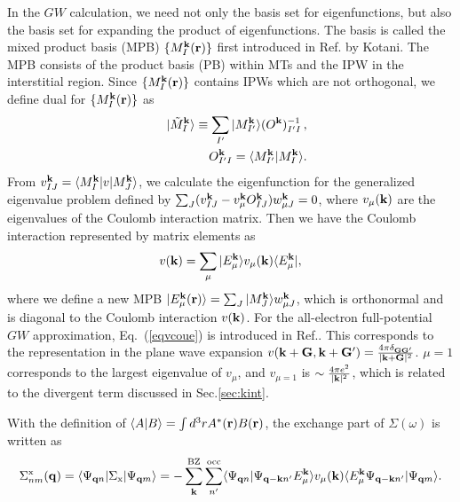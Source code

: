 \documentclass[a4paper,10pt,fleqn]{article}
\def\Psiqn{{\Psi_{{\bf q}n}}}
\def\Psiqm{{\Psi_{{\bf q}m}}}
\def\Psiqn{{\Psi_{{\bf q}n}}}
\newcommand{\bfq}{{\bf q}}
\newcommand{\bfk}{{\bf k}}
\newcommand{\bfr}{{\bf r}}
\newcommand{\bfG}{{\bf G}}
\newcommand{\req}[1]{\mbox{Eq.~(\ref{#1})}}
\begin{document}
In the $GW$ calculation, we need not only the basis set for
eigenfunctions, but also the basis set for expanding the product of eigenfunctions.
The basis is called the mixed product basis (MPB) $\{M^{\bf k}_I({\bf r}) \}$ first introduced in Ref.\cite{kotani_all-electron_2002} by Kotani. The MPB consists of the product basis (PB) within MTs \cite{aryasetiawan_product-basis_1994}
and the IPW in the interstitial region.
Since $\{M^{\bf k}_I({\bf r}) \}$ contains IPWs which are not orthogonal,
we define dual for $\{M^{\bf k}_I({\bf r}) \}$ as
\begin{eqnarray}
&& |\tilde{M}^{\bf k}_{I} \rangle \equiv \sum_{I'}
   |M^{\bf k}_{I'} \rangle (O^{\bf k})^{-1}_{I'I} \, , \\
&& O^{\bf k}_{I'I} = \langle M^{\bf k}_{I'} |  M^{\bf k}_I \rangle.
\label{eq:ovlmpb}
\end{eqnarray}
From $v_{IJ}^\bfk= \langle M^{\bf k}_{I} |v|  M^{\bf k}_J \rangle$,  
we calculate the eigenfunction for the generalized eigenvalue problem defined by
$\sum_J (v_{IJ}^\bfk - v^\bfk_\mu O^{\bfk}_{IJ} ) w_{\mu J}^\bfk = 0$, where
$v_\mu(\bfk)$ are the eigenvalues of the Coulomb interaction matrix.
Then we have the Coulomb interaction represented by matrix elements as 
\begin{eqnarray}
v(\bfk)=\sum_{\mu} | E^{\bfk}_\mu \rangle {v_\mu(\bfk)} 
\langle E^{\bfk}_\mu |,
\label{eqvcoue}
\end{eqnarray}
where we define a new MPB 
$|E^{\bf k}_\mu({\bf r})\rangle=\sum_J |M^\bfk_J\rangle w^\bfk_{\mu J}$,
which is orthonormal and is diagonal to the Coulomb interaction $v(\bfk)$. 
For the all-electron full-potential $GW$ approximation,
\req{eqvcoue} is introduced in Ref.\cite{friedrich_efficient_2010}.
This corresponds to the representation in the plane wave expansion 
$v(\bfk+\bfG,\bfk+\bfG')=\frac{4 \pi \delta_{\bfG \bfG'}}{|\bfk+\bfG|^2}$.
$\mu=1$ corresponds to the largest eigenvalue of $v_{\mu}$, and 
$v_{\mu=1}$ is $\sim \frac{4 \pi e^2}{|\bfk|^2}$, which is related to 
the divergent term discussed in Sec.\ref{sec:kint}.

With the definition of 
$\langle A| B\rangle =\int d^3r A^*(\bfr) B(\bfr)$,
the exchange part of $\Sigma(\omega)$ is written as
\begin{eqnarray}
\Sigma^{\rm x}_{nm}(\bfq)=
\langle \Psiqn|\Sigma_{\rm x} |\Psiqm \rangle
=-\sum^{\rm BZ}_{{\bf k}}  \sum^{\rm  occ}_{n'}
\langle \Psiqn| \Psi_{{\bf q-k}n'} E_\mu^{\bf k} \rangle
v_{\mu}({\bf k})
\langle E_\mu^\bfk \Psi_{{\bf q-k}n'} | \Psiqm \rangle.
\label{eq:sigx}
\end{eqnarray}
\end{document}

